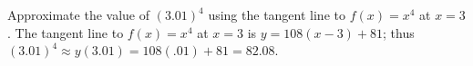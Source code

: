{Approximate the value of $(3.01)^4$ using the tangent line to $f(x) = x^4$ at $x=3$.
}
{The tangent line to $f(x) = x^4$ at $x=3$ is $y=108(x-3)+81$; thus $(3.01)^4 \approx y(3.01) = 108(.01)+81 = 82.08$. 
}
